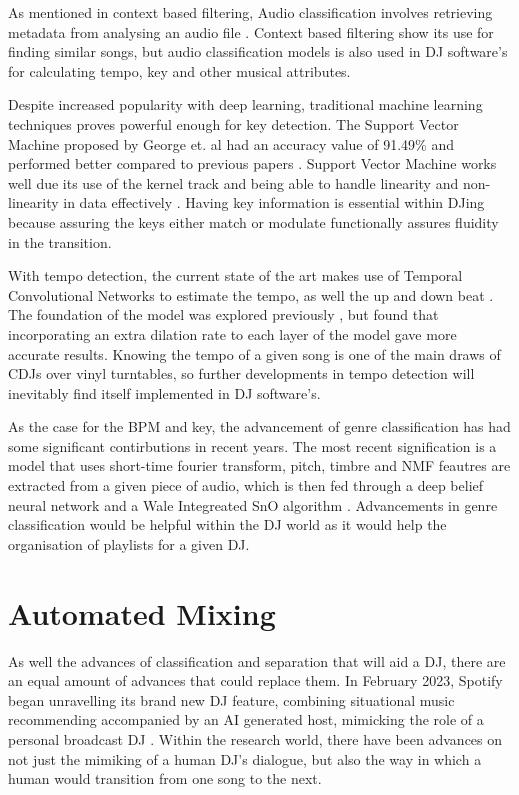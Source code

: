 As mentioned in context based filtering, Audio classification involves retrieving metadata from analysing an audio file \citep{sharma_audio_2021}. Context based filtering show its use for finding similar songs, but audio classification models is also used in DJ software's for calculating tempo, key and other musical attributes.

Despite increased popularity with deep learning, traditional machine learning techniques proves powerful enough for key detection. The Support Vector Machine proposed by George et. al had an accuracy value of 91.49\% and performed better compared to previous papers \citep{george_development_2022}. Support Vector Machine works well due its use of the kernel track and being able to handle linearity and non-linearity in data effectively \citep{hofmann_support_2006}. Having key information is essential within DJing because assuring the keys either match or modulate functionally assures fluidity in the transition. 

With tempo detection, the current state of the art makes use of Temporal Convolutional Networks to estimate the tempo, as well the up and down beat \citep{bock_deconstruct_2020}. The foundation of the model was explored previously \citep{bock_multi-task_2019}, but found that incorporating an extra dilation rate to each layer of the model gave more accurate results. Knowing the tempo of a given song is one of the main draws of CDJs over vinyl turntables, so further developments in tempo detection will inevitably find itself implemented in DJ software's.

As the case for the BPM and key, the advancement of genre classification has had some significant contirbutions in recent years. The most recent signification is a model that uses short-time fourier transform, pitch, timbre and NMF feautres are extracted from a given piece of audio, which is then fed through a deep belief neural network and a Wale Integreated SnO algorithm \citep{kumaraswamy_optimal_2022}. Advancements in genre classification would be helpful within the DJ world as it would help the organisation of playlists for a given DJ.

\section{Automated Mixing}
As well the advances of classification and separation that will aid a DJ, there are an equal amount of advances that could replace them. In February 2023, Spotify began unravelling its brand new DJ feature, combining situational music recommending accompanied by an AI generated host, mimicking the role of a personal broadcast DJ \citep{naomi_spotify_2023}. Within the research world, there have been advances on not just the mimiking of a human DJ's dialogue, but also the way in which a human would transition from one song to the next.

